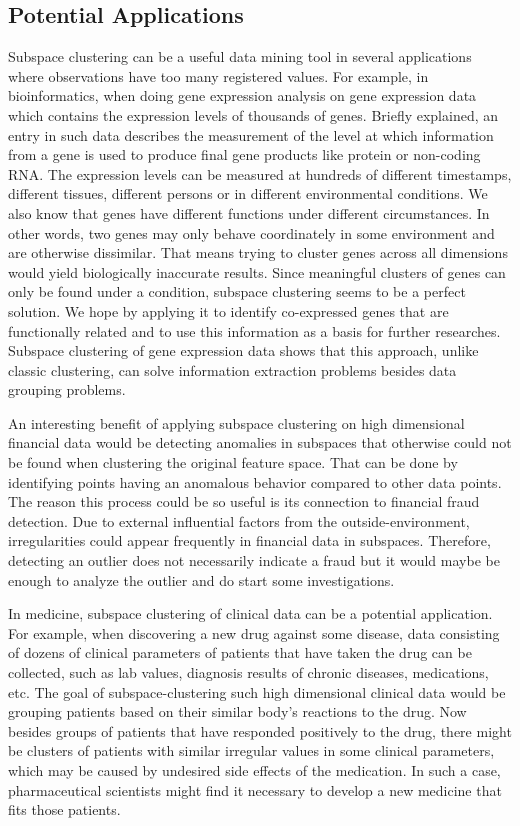 \subsection{Potential Applications} Subspace clustering can be a useful data mining tool in several applications where observations have too many registered values. 
For example, in bioinformatics, when doing gene expression analysis on gene expression data which contains the expression levels of thousands of genes. Briefly explained, an entry in such data describes the measurement of the level at which information from a gene is used to produce final gene products like protein or non-coding RNA. The expression levels can be measured at hundreds of different timestamps, different tissues, different persons or in different environmental conditions. We also know that genes have different functions under different circumstances. In other words, two genes may only behave coordinately in some environment and are otherwise dissimilar. That means trying to cluster genes across all dimensions would yield biologically inaccurate results. Since meaningful clusters of genes can only be found under a condition, subspace clustering seems to be a perfect solution. We hope by applying it to identify co-expressed genes that are functionally related and to use this information as a basis for further researches.
Subspace clustering of gene expression data shows that this approach, unlike classic clustering, can solve information extraction problems besides data grouping problems.   

An interesting benefit of applying subspace clustering on high dimensional financial data would be detecting anomalies in subspaces that otherwise could not be found when clustering the original feature space. That can be done by identifying points having an anomalous behavior compared to other data points. The reason this process could be so useful is its connection to financial fraud detection. Due to external influential factors from the outside-environment, irregularities could appear frequently in financial data in subspaces. Therefore, detecting an outlier does not necessarily indicate a fraud but it would maybe be enough to analyze the outlier and do start some investigations.

In medicine, subspace clustering of clinical data can be a potential application. For example, when discovering a new drug against some disease, data consisting of dozens of clinical parameters of patients that have taken the drug can be collected, such as lab values, diagnosis results of chronic diseases, medications, etc. The goal of subspace-clustering such high dimensional clinical data would be grouping patients based on their similar body’s reactions to the drug. Now besides groups of patients that have responded positively to the drug, there might be clusters of patients with similar irregular values in some clinical parameters, which may be caused by undesired side effects of the medication. In such a case, pharmaceutical scientists might find it necessary to develop a new medicine that fits those patients.

